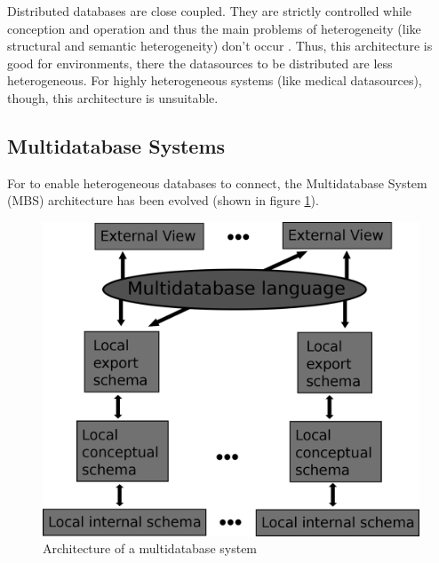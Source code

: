 Distributed databases are close coupled. They are strictly controlled while conception and operation and thus the main problems of heterogeneity (like structural and semantic heterogeneity) don't occur \cite[p. 93]{DBLP:books/dp/LeserN2006}. 
Thus, this architecture is good for environments, there the datasources to be distributed are less heterogeneous. For highly heterogeneous systems (like medical datasources), though, this architecture is unsuitable.
 

\subsection{Multidatabase Systems}

For to enable heterogeneous databases to connect, the Multidatabase System (MBS) architecture has been evolved (shown in figure \ref{MBSDatabaseArchitecture}). 

\begin{figure}[H]
	\begin{center}
		\includegraphics[scale=0.5]{figures/MultidatabaseArchitecture.png}
	\end{center}
	\caption{Architecture of a  multidatabase system \cite[p. 94]{DBLP:books/dp/LeserN2006}}
	\label{MBSDatabaseArchitecture}
\end{figure}

